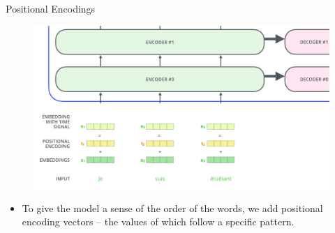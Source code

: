 \documentclass[handout]{beamer}
\begin{document}
\begin{frame}{Positional Encodings}


   \begin{figure}[h]
        	\includegraphics[scale = 0.2]{pics/transformer_positional_encoding_vectors.png}
        \end{figure}  




\begin{scriptsize}
\begin{itemize}

 \item To give the model a sense of the order of the words, we add positional encoding vectors -- the values of which follow a specific pattern. 


\end{itemize}

\end{scriptsize}


\end{frame}
\end{document}
